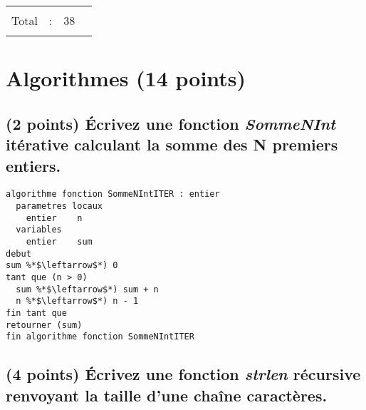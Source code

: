 \documentclass[11pt,a4paper]{article}
\begin{document}
\begin{table}[h!]
\begin{minipage}{0.4\textwidth}
\begin{tabular}{| C{1cm} | C{1cm} | C{1cm} | C{1cm} |}
             &     &     &       \\
        \hline
             &     &     &       \\
       Total &  :  & 38  &       \\
             &     &     &       \\
        \hline
    \end{tabular}
  \end{minipage}
\end{table}


\vfillLast
\newpage

\section{Algorithmes (14 points)}

\subsection{(2 points) \'Ecrivez une fonction \og \textit{SommeNInt} \fg{} itérative calculant la somme des N premiers entiers. }

\bigskip

\begin{center}

\begin{lstlisting}[style=algorithmique]
algorithme fonction SommeNIntITER : entier
  parametres locaux
    entier    n
  variables
    entier    sum
debut
sum %*$\leftarrow$*) 0
tant que (n > 0)
  sum %*$\leftarrow$*) sum + n
  n %*$\leftarrow$*) n - 1
fin tant que
retourner (sum)
fin algorithme fonction SommeNIntITER \end{lstlisting}

\end{center}

\smallskip


\subsection{(4 points) \'Ecrivez une fonction \og \textit{strlen} \fg{} récursive renvoyant la taille d'une chaîne caractères. }

\bigskip
\end{document}
